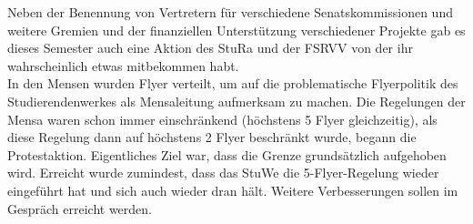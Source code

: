 Neben der Benennung von Vertretern für verschiedene Senatskommissionen und weitere Gremien und der finanziellen Unterstützung verschiedener Projekte gab es dieses Semester auch eine Aktion des StuRa und der FSRVV von der ihr wahrscheinlich etwas mitbekommen habt.\\
In den Mensen wurden Flyer verteilt, um auf die problematische Flyerpolitik des Studierendenwerkes als Mensaleitung aufmerksam zu machen. Die Regelungen der Mensa waren schon immer einschränkend (höchstens 5 Flyer gleichzeitig), als diese Regelung dann auf höchstens 2 Flyer beschränkt wurde, begann die Protestaktion. Eigentliches Ziel war, dass die Grenze grundsätzlich aufgehoben wird. Erreicht wurde zumindest, dass das StuWe die 5-Flyer-Regelung wieder eingeführt hat und sich auch wieder dran hält. Weitere Verbesserungen sollen im Gespräch erreicht werden.

